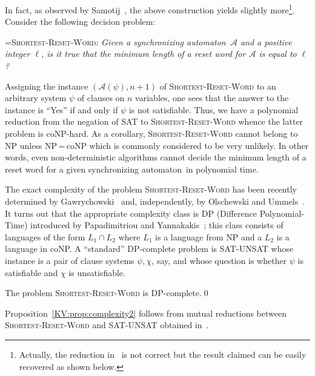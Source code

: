 \documentclass{irmaart}
\newcommand{\san}{synchronizing au\-tom\-a\-ton}
\theoremstyle{plain}
\begin{document}
In fact, as observed by Samotij~\cite{Samotij:2007}, the above
construction yields slightly more\footnote{Actually, the reduction
in~\cite{Samotij:2007} is not correct but the result claimed can
be easily recovered as shown below.}. Consider the following
decision problem:

\smallskip

\hangindent=\parindent \noindent \textsc{Shortest-Reset-Word:}
\emph{Given a \san\ $\mathcal{A}$ and a positive integer $\ell$,
is it true that the minimum length of a reset word for
$\mathcal{A}$ is equal to $\ell$?}

\smallskip

\noindent Assigning the instance $(\mathcal{A}(\psi),n+1)$ of
\textsc{Shortest-Reset-Word} to an arbitrary system $\psi$ of
clauses on $n$ variables, one sees that the answer to the instance
is ``Yes'' if and only if $\psi$ is not satisfiable. Thus, we have
a polynomial reduction from the negation of \textsc{SAT} to
\textsc{Shortest-Reset-Word} whence the latter problem is
\textsf{coNP}-hard. As a corollary, \textsc{Shortest-Reset-Word}
cannot belong to \textsf{NP} unless \textsf{NP}\,=\,\textsf{coNP}
which is commonly considered to be very unlikely. In other words,
even non-deterministic algorithms cannot decide the minimum length
of a reset word for a given \san\ in polynomial time.

The exact complexity of the problem \textsc{Shortest-Reset-Word}
has been recently determined by
Gawrychowski~\cite{Gawrychowski:2008} and, independently, by
Olschewski and Ummels~\cite{Olschewski&Ummels:2010}. It turns out
that the appropriate complexity class is \textsf{DP}
(\textsf{Difference Polynomial-Time}) introduced by Papadimitriou
and Yannakakis~\cite{Papadimitriou&Yannakakis:1984}; this class
consists of languages of the form $L_1\cap L_2$ where $L_1$ is a
language from \textsf{NP} and a $L_2$ is a language in
\textsf{coNP}. A ``standard'' \textsf{DP}-complete problem is
\textsc{SAT-UNSAT} whose instance is a pair of clause systems
$\psi,\chi$, say, and whose question is whether $\psi$ is
satisfiable and $\chi$ is unsatisfiable.

\begin{proposition}
\label{KV:prop:complexity2} The problem \textsc{Shortest-Reset-Word} is
\textsf{DP}-complete.\qed
\end{proposition}

Proposition~\ref{KV:prop:complexity2} follows from mutual
reductions between \textsc{Shortest-Reset-Word} and
\textsc{SAT-UNSAT} obtained
in~\cite{Gawrychowski:2008,Olschewski&Ummels:2010}.
\end{document}
